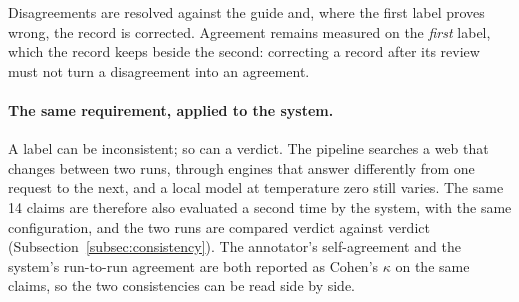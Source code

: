 Disagreements are resolved against the guide and, where the first
label proves wrong, the record is corrected. Agreement remains
measured on the \emph{first} label, which the record keeps beside the
second: correcting a record after its review must not turn a
disagreement into an agreement.

\paragraph{The same requirement, applied to the system.} A label can
be inconsistent; so can a verdict. The pipeline searches a web that
changes between two runs, through engines that answer differently from
one request to the next, and a local model at temperature zero still
varies. The same 14 claims are therefore also evaluated a second time
by the system, with the same configuration, and the two runs are
compared verdict against verdict (Subsection~\ref{subsec:consistency}).
The annotator's self-agreement and the system's run-to-run agreement
are both reported as Cohen's $\kappa$ on the same claims, so the two
consistencies can be read side by side.
